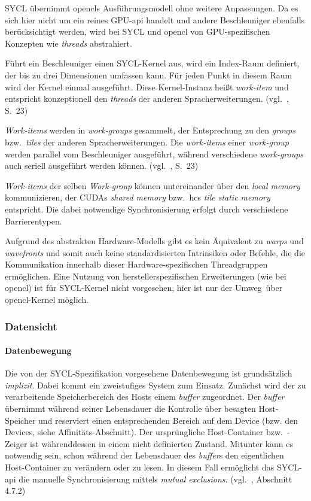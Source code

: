 SYCL übernimmt \gls{opencl}s Ausführungsmodell ohne weitere Anpassungen. Da es
sich hier nicht um ein reines GPU-\gls{api} handelt und andere Beschleuniger
ebenfalls berücksichtigt werden, wird bei SYCL und \gls{opencl} von
GPU-spezifischen Konzepten wie \textit{threads} abstrahiert.

Führt ein Beschleuniger einen SYCL-Kernel aus, wird ein Index-Raum definiert,
der bis zu drei Dimensionen umfassen kann. Für jeden Punkt in diesem Raum wird
der Kernel einmal ausgeführt. Diese Kernel-Instanz heißt \textit{work-item} und
entspricht konzeptionell den \textit{threads} der anderen Spracherweiterungen.
(vgl.~\cite{syclspec}, S.\ 23)

\textit{Work-items} werden in \textit{work-groups} gesammelt, der Entsprechung
zu den \textit{groups} bzw.\ \textit{tiles} der anderen Spracherweiterungen.
Die \textit{work-items} einer \textit{work-group} werden parallel vom
Beschleuniger ausgeführt, während verschiedene \textit{work-groups} auch seriell
ausgeführt werden können.
(vgl.~\cite{syclspec}, S.\ 23)

\textit{Work-items} der selben \textit{Work-group} können untereinander über
den \textit{local memory} kommunizieren, der CUDAs \textit{shared memory} bzw.\
\gls{hc}s \textit{tile static memory} entspricht. Die dabei notwendige
Synchronisierung erfolgt durch verschiedene Barrierentypen.

Aufgrund des abstrakten Hardware-Modells gibt es kein Äquivalent zu
\textit{warps} und \textit{wavefronts} und somit auch keine standardisierten
Intrinsiken oder Befehle, die die Kommunikation innerhalb dieser
Hardware-spezifischen Threadgruppen ermöglichen. Eine Nutzung von
herstellerspezifischen Erweiterungen (wie bei \gls{opencl}) ist für SYCL-Kernel
nicht vorgesehen, hier ist nur der \glqq Umweg\grqq\ über \gls{opencl}-Kernel
möglich.

\subsubsection{Datensicht}

\paragraph{Datenbewegung}

Die von der SYCL-Spezifikation vorgesehene Datenbewegung ist grundsätzlich
\textit{implizit}. Dabei kommt ein zweistufiges System zum Einsatz. Zunächst
wird der zu verarbeitende Speicherbereich des Hosts einem \textit{buffer}
zugeordnet. Der \textit{buffer} übernimmt während seiner Lebensdauer die
Kontrolle über besagten Host-Speicher und reserviert einen entsprechenden
Bereich auf dem Device (bzw. den Devices, siehe Affinitäts-Abschnitt). Der
ursprüngliche Host-Container bzw.\ -Zeiger ist währenddessen in einem nicht
definierten Zustand. Mitunter kann es notwendig sein, schon während der
Lebensdauer des \textit{buffer}s den eigentlichen Host-Container zu verändern
oder zu lesen. In diesem Fall ermöglicht das SYCL-\gls{api} die manuelle
Synchronisierung mittels \textit{mutual exclusions}.
(vgl.~\cite{syclspec}, Abschnitt 4.7.2)

